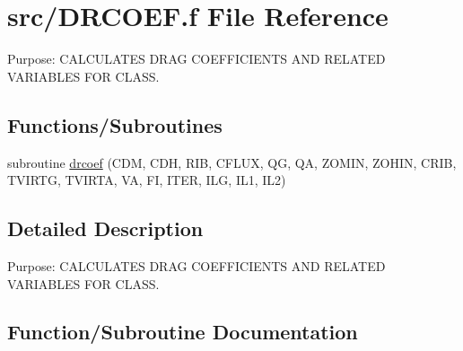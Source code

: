 \hypertarget{DRCOEF_8f}{}\section{src/\+D\+R\+C\+O\+E\+F.f File Reference}
\label{DRCOEF_8f}


Purpose\+: C\+A\+L\+C\+U\+L\+A\+T\+E\+S D\+R\+A\+G C\+O\+E\+F\+F\+I\+C\+I\+E\+N\+T\+S A\+N\+D R\+E\+L\+A\+T\+E\+D V\+A\+R\+I\+A\+B\+L\+E\+S F\+O\+R C\+L\+A\+S\+S.  


\subsection*{Functions/\+Subroutines}
\begin{DoxyCompactItemize}
\item 
subroutine \hyperlink{DRCOEF_8f_aae5a711d9800a0a042c1cd85f78c87dc}{drcoef} (C\+D\+M, C\+D\+H, R\+I\+B, C\+F\+L\+U\+X, Q\+G, Q\+A, Z\+O\+M\+I\+N, Z\+O\+H\+I\+N, C\+R\+I\+B, T\+V\+I\+R\+T\+G, T\+V\+I\+R\+T\+A, V\+A, F\+I, I\+T\+E\+R, I\+L\+G, I\+L1, I\+L2)
\end{DoxyCompactItemize}


\subsection{Detailed Description}
Purpose\+: C\+A\+L\+C\+U\+L\+A\+T\+E\+S D\+R\+A\+G C\+O\+E\+F\+F\+I\+C\+I\+E\+N\+T\+S A\+N\+D R\+E\+L\+A\+T\+E\+D V\+A\+R\+I\+A\+B\+L\+E\+S F\+O\+R C\+L\+A\+S\+S. 



\subsection{Function/\+Subroutine Documentation}
\hypertarget{DRCOEF_8f_aae5a711d9800a0a042c1cd85f78c87dc}{}
